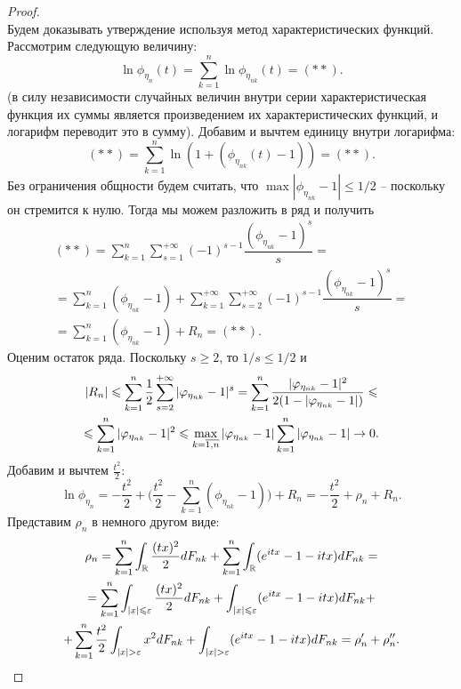 \begin{proof}
\[    \]
    Будем доказывать утверждение используя метод характеристических функций.
    Рассмотрим следующую величину:
    \[
        \ln \phi_{\eta_n}(t) = \sum\limits_{k = 1}^{n} \ln \phi_{\eta_{nk}}(t) = (**).
    \]
    (в силу независимости случайных величин внутри серии характеристическая функция их суммы является произведением их характеристических функций, и логарифм переводит это в сумму).
    Добавим и вычтем единицу внутри логарифма:
    \[
        (**) = \sum\limits_{k = 1}^{n} \ln (1 + (\phi_{\eta_{nk}}(t) - 1)) = (**).
    \]
    Без ограничения общности будем считать, что $\max |\phi_{\eta_{nk}} - 1| \leq 1/2$ -- поскольку он стремится к нулю.
    Тогда мы можем разложить в ряд и получить
    \begin{multline*}
        (**) = \sum\limits_{k = 1}^{n} \sum\limits_{s = 1}^{+\infty} (-1)^{s - 1} \dfrac{(\phi_{\eta_{nk}} - 1)^s}{s} = \\ = \sum\limits_{k = 1}^{n} (\phi_{\eta_{nk}} - 1) + \sum\limits_{k = 1}^{+\infty} \sum\limits_{s = 2}^{+\infty} (-1)^{s - 1} \dfrac{(\phi_{\eta_{nk}} - 1)^s}{s} = \\ = \sum\limits_{k = 1}^{n} (\phi_{\eta_{nk}} - 1) + R_n = (**).
    \end{multline*}
    Оценим остаток ряда. Поскольку $s \geq 2$, то $1/s \leq 1/2$ и
    \begin{multline*}
        |R_n| \leqslant \sum\limits_{k = 1}^{n} \dfrac{1}{2} \sum\limits_{s = 2}^{+\infty} |\varphi_{\eta_{nk}} - 1|^s = \sum\limits_{k = 1}^{n} \dfrac{|\varphi_{\eta_{nk}} - 1|^2}{2(1 - |\varphi_{\eta_{nk}} - 1|)} \leqslant \\ \leqslant \sum\limits_{k = 1}^{n} |\varphi_{\eta_{nk}} - 1|^2 \leqslant \max\limits_{k = \overline{1, n}} |\varphi_{\eta_{nk}} - 1| \sum\limits_{k = 1}^{n}|\varphi_{\eta_{nk}} - 1| \rightarrow 0.
    \end{multline*}
    Добавим и вычтем $\frac{t^2}{2}$:
    \[
        \ln \phi_{\eta_n} = -\dfrac{t^2}{2} + \biggr(\dfrac{t^2}{2} - \sum\limits_{k = 1}^n (\phi_{\eta_{nk}} - 1)\biggr) + R_n = -\dfrac{t^2}{2} + \rho_n + R_n.
    \]
    Представим $\rho_n$ в немного другом виде:
    \begin{multline*}
        \rho_n = \sum\limits_{k = 1}^{n} \int_{\mathbb{R}} \dfrac{(tx)^2}{2}dF_{nk} + \sum\limits_{k = 1}^{n} \int_{\mathbb{R}} (e^{itx} - 1 - itx)dF_{nk} = \\
        = \sum\limits_{k = 1}^{n} \int_{|x| \leqslant \varepsilon} \dfrac{(tx)^2}{2}dF_{nk} + \int_{|x| \leqslant \varepsilon} (e^{itx} - 1 - itx)dF_{nk} + \\
        + \sum\limits_{k = 1}^{n} \dfrac{t^2}{2} \int_{|x| > \varepsilon} x^2 dF_{nk} + \int_{|x| > \varepsilon} (e^{itx} - 1 - itx)dF_{nk}  = \rho_n' + \rho_n''.
    \end{multline*}


\end{proof}
